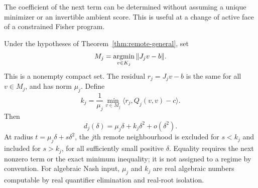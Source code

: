 The coefficient of the next term can be determined without assuming a
unique minimizer or an invertible ambient score. This is useful at a
change of active face of a constrained Fisher program.

\begin{theorem}\label{thm:critical-window}
Under the hypotheses of Theorem~\ref{thm:remote-general}, set
\[
 M_j=\mathop{\rm argmin}_{v\in K_j}\|J_jv-b\|.
\]
This is a nonempty compact set. The residual $r_j=J_jv-b$ is the same
for all $v\in M_j$, and has norm $\mu_j$. Define
\begin{equation}\label{eq:critical-coefficient}
 k_j=\frac1{\mu_j}\min_{v\in M_j}
                   \langle r_j,Q_j(v,v)-c\rangle.
\end{equation}
Then
\begin{equation}\label{eq:critical-expansion}
 d_j(\delta)=\mu_j\delta+k_j\delta^2+o(\delta^2).
\end{equation}
At radius $t=\mu_j\delta+s\delta^2$, the $j$th remote neighbourhood
is excluded for $s<k_j$ and included for $s>k_j$, for all sufficiently
small positive $\delta$. Equality requires the next nonzero term or the
exact minimum inequality; it is not assigned to a regime by convention.
For algebraic Nash input, $\mu_j$ and $k_j$ are real algebraic numbers
computable by real quantifier elimination and real-root isolation.
\end{theorem}
